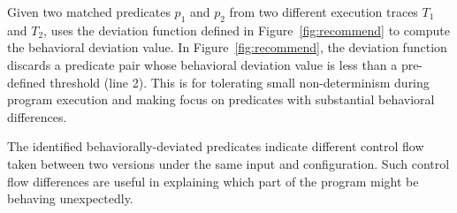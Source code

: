 Given two matched predicates $p_{1}$ and $p_{2}$ from two different execution traces $T_{1}$ and $T_{2}$,
\ourtool uses the {deviation} function defined in Figure~\ref{fig:recommend}
to compute the behavioral deviation value.
In Figure~\ref{fig:recommend}, the {deviation} function
 discards a predicate pair whose behavioral deviation value is less than
a pre-defined threshold (line 2). This is for tolerating small non-determinism
during program execution and
making \ourtool focus on predicates with substantial
behavioral differences.

The identified behaviorally-deviated predicates indicate different
control flow taken between two versions under the same input
and configuration. Such control flow differences are useful
in explaining %
which part of the program might be behaving unexpectedly. 





